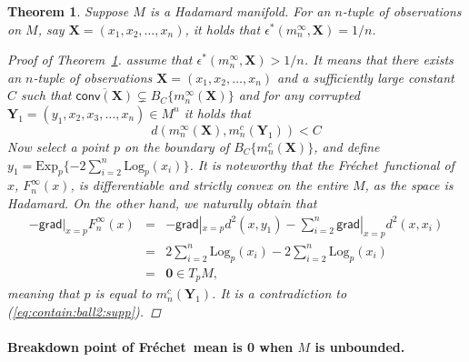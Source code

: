 \documentclass[preprint]{imsart}
\def\Frechet{Fr\'{e}chet}
\theoremstyle{plain}
\newtheorem{theorem}{Theorem}
\theoremstyle{remark}
\begin{document}
\begin{appendix}
\begin{theorem}
Suppose $M$ is a Hadamard manifold. For an $n$-tuple of observations on $M$, say $\textbf{X}=(x_1, x_2, \ldots, x_n)$, it holds that $\epsilon^{*}(m^{\infty}_{n},\mathbf{X}) = 1/n$. 
\begin{proof}[Proof of Theorem~\ref{thm:frechet:supp}]
assume that $\epsilon^{*}(m^{\infty}_{n},\mathbf{X}) > 1/n$. It means that there exists an $n$-tuple of observations $\textbf{X} = (x_1, x_2, \ldots, x_{n})$ and a sufficiently large constant $C$ such that $\overline{\textsf{conv}(\mathbf{X})} \subsetneq B_{C}\{m^{\infty}_{n}(\textbf{X})\}$ and for any corrupted $\textbf{Y}_{1}=(y_1, x_2, x_3, \ldots, x_n) \in M^n$ it holds that
\begin{equation}\label{eq:contain:ball2:supp}
d(m^{\infty}_{n}(\textbf{X}), m^{c}_{n}(\textbf{Y}_{1})) < C
\end{equation}
Now select a point $p$ on the boundary of $B_{C}\{m^{c}_{n}(\textbf{X})\}$, and define $y_1 = \mbox{Exp}_{p}\{-2\sum_{i=2}^{n}\mbox{Log}_{p}(x_i)\}$. It is noteworthy that the \Frechet\ functional of $x$, $F^{\infty}_{n}(x)$, is differentiable and strictly convex on the entire $M$, as the space is Hadamard. On the other hand, we naturally obtain that  
\begin{eqnarray*}
-\textsf{grad}|_{x=p}F^{\infty}_{n}(x) &=& - \textsf{grad}|_{x=p} d^2(x, y_1) - \sum_{i=2}^{n} \textsf{grad}|_{x=p}d^2(x, x_i) \\
&=& 2\sum_{i=2}^{n}\mbox{Log}_{p}(x_i) - 2\sum_{i=2}^{n}\mbox{Log}_{p}(x_i) \\
&=& \textbf{0} \in T_{p}M,
\end{eqnarray*}
meaning that $p$ is equal to $m^{c}_{n}(\textbf{Y}_1)$. It is a contradiction to (\ref{eq:contain:ball2:supp}).
\end{proof}
\label{thm:frechet:supp}
\end{theorem}

\paragraph{Breakdown point of \Frechet\ mean is 0 when $M$ is unbounded.}


\end{appendix}
\end{document}
